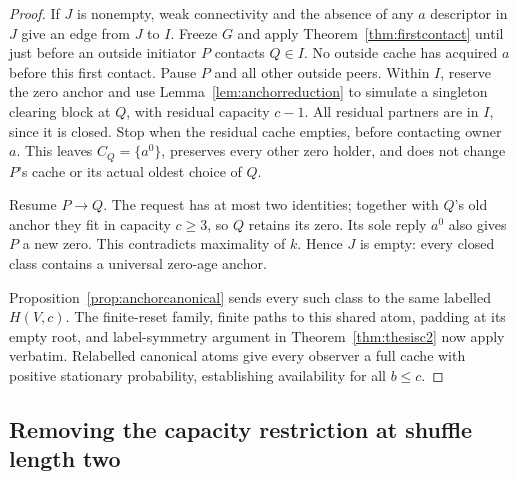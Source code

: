 \documentclass[11pt]{article}
\begin{document}
\begin{proof}
If $J$ is nonempty, weak connectivity and the absence
of any $a$ descriptor in $J$ give an edge from $J$ to
$I$. Freeze $G$ and apply Theorem~\ref{thm:firstcontact}
until just before an outside initiator $P$ contacts
$Q\in I$. No outside cache has acquired $a$ before
this first contact. Pause $P$ and all other outside
peers. Within $I$, reserve the zero anchor and use
Lemma~\ref{lem:anchorreduction} to simulate a singleton
clearing block at $Q$, with residual capacity $c-1$.
All residual partners are in $I$, since it is closed.
Stop when the residual cache empties, before contacting
owner $a$. This leaves $C_Q=\{a^0\}$, preserves every
other zero holder, and does not change $P$'s cache or
its actual oldest choice of $Q$.

Resume $P\to Q$. The request has at most two identities;
together with $Q$'s old anchor they fit in capacity
$c\ge3$, so $Q$ retains its zero. Its sole reply $a^0$
also gives $P$ a new zero. This contradicts maximality
of $k$. Hence $J$ is empty: every closed class contains
a universal zero-age anchor.

Proposition~\ref{prop:anchorcanonical} sends every such
class to the same labelled $H(V,c)$. The finite-reset
family, finite paths to this shared atom, padding at
its empty root, and label-symmetry argument in
Theorem~\ref{thm:thesisc2} now apply verbatim.
Relabelled canonical atoms give every observer a
full cache with positive stationary probability,
establishing availability for all $b\le c$.
\end{proof}

\subsection{Removing the capacity restriction at shuffle length two}
\end{document}
